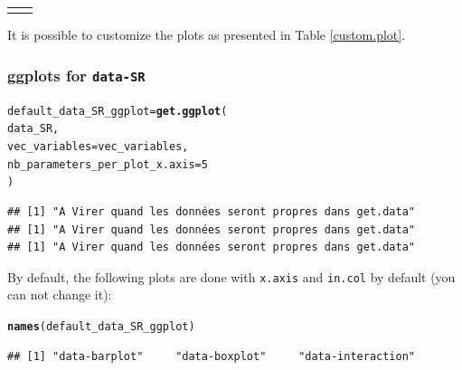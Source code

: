 \documentclass{article}\usepackage[]{graphicx}\usepackage[]{color}
\makeatletter
\newcommand{\hlnum}[1]{\textcolor[rgb]{0.686,0.059,0.569}{#1}}%
\newcommand{\hlstd}[1]{\textcolor[rgb]{0.345,0.345,0.345}{#1}}%
\newcommand{\hlkwb}[1]{\textcolor[rgb]{0.69,0.353,0.396}{#1}}%
\newcommand{\hlkwc}[1]{\textcolor[rgb]{0.333,0.667,0.333}{#1}}%
\newcommand{\hlkwd}[1]{\textcolor[rgb]{0.737,0.353,0.396}{\textbf{#1}}}%
\newenvironment{kframe}{%
 \def\at@end@of@kframe{}%
 \ifinner\ifhmode%
  \def\at@end@of@kframe{\end{minipage}}%
  \begin{minipage}{\columnwidth}%
 \fi\fi%
 \def\FrameCommand##1{\hskip\@totalleftmargin \hskip-\fboxsep
 \colorbox{shadecolor}{##1}\hskip-\fboxsep
     \hskip-\linewidth \hskip-\@totalleftmargin \hskip\columnwidth}%
 \MakeFramed {\advance\hsize-\width
   \@totalleftmargin\z@ \linewidth\hsize
   \@setminipage}}%
 {\par\unskip\endMakeFramed%
 \at@end@of@kframe}
\newenvironment{knitrout}{}{} %
\makeatother
\begin{document}
\begin{center}
\begin{tabular}{cc}
\begin{knitrout}
{}



\end{knitrout}
&
\\
\end{tabular}
\end{center}

It is possible to customize the plots as presented in Table \ref{custom.plot}.

\subsubsection{ggplots for \texttt{data-SR} }

\begin{knitrout}
\color{fgcolor}\begin{kframe}
\begin{alltt}
\hlstd{default_data_SR_ggplot} \hlkwb{=} \hlkwd{get.ggplot}\hlstd{(}
        \hlstd{data_SR,}
        \hlkwc{vec_variables} \hlstd{= vec_variables,}
        \hlkwc{nb_parameters_per_plot_x.axis} \hlstd{=} \hlnum{5}
        \hlstd{)}
\end{alltt}


{\ttfamily\noindent\itshape{}}\begin{verbatim}
## [1] "A Virer quand les données seront propres dans get.data"
## [1] "A Virer quand les données seront propres dans get.data"
## [1] "A Virer quand les données seront propres dans get.data"
\end{verbatim}
\end{kframe}
\end{knitrout}

By default, the following plots are done with \texttt{x.axis} and \texttt{in.col} by default (you can not change it):

\begin{knitrout}
\color{fgcolor}\begin{kframe}
\begin{alltt}
\hlkwd{names}\hlstd{(default_data_SR_ggplot)}
\end{alltt}
\begin{verbatim}
## [1] "data-barplot"     "data-boxplot"     "data-interaction"
\end{verbatim}
\end{kframe}
\end{knitrout}
\end{document}
